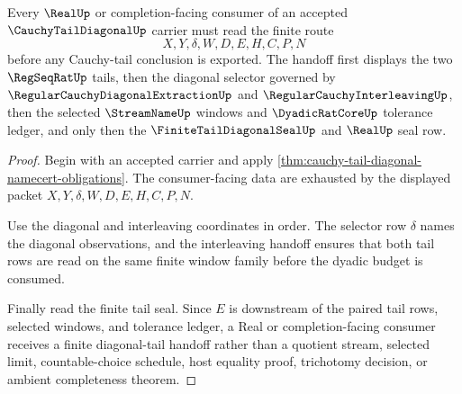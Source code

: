 \begin{theorem}\label{thm:cauchy-tail-diagonal-real-handoff}
Every $\RealUp$ or completion-facing consumer of an accepted $\CauchyTailDiagonalUp$ carrier must read the finite route
$$
X,Y,\delta,W,D,E,H,C,P,N
$$
before any Cauchy-tail conclusion is exported. The handoff first displays the two $\RegSeqRatUp$ tails, then the diagonal selector governed by $\RegularCauchyDiagonalExtractionUp$ and $\RegularCauchyInterleavingUp$, then the selected $\StreamNameUp$ windows and $\DyadicRatCoreUp$ tolerance ledger, and only then the $\FiniteTailDiagonalSealUp$ and $\RealUp$ seal row.
\end{theorem}
\begin{proof}
Begin with an accepted carrier and apply \autoref{thm:cauchy-tail-diagonal-namecert-obligations}. The consumer-facing data are exhausted by the displayed packet $X,Y,\delta,W,D,E,H,C,P,N$.

Use the diagonal and interleaving coordinates in order. The selector row $\delta$ names the diagonal observations, and the interleaving handoff ensures that both tail rows are read on the same finite window family before the dyadic budget is consumed.

Finally read the finite tail seal. Since $E$ is downstream of the paired tail rows, selected windows, and tolerance ledger, a Real or completion-facing consumer receives a finite diagonal-tail handoff rather than a quotient stream, selected limit, countable-choice schedule, host equality proof, trichotomy decision, or ambient completeness theorem.
\end{proof}


\begin{closurestatus}{\CauchyTailDiagonalUp}
  \theoryclosure{\seedClosure}
  \formalstatus{\unformalizedV}
\end{closurestatus}
